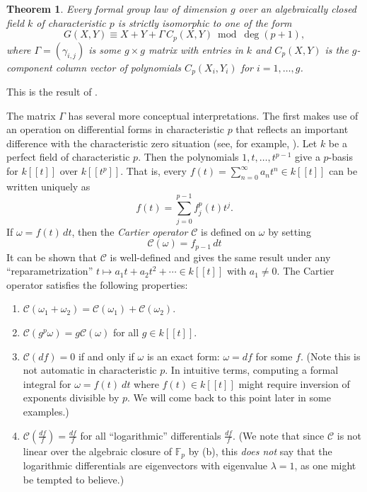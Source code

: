 \documentclass[12pt]{amsart}
\theoremstyle{theorem}
\newtheorem{thm}{Theorem}
\newcommand{\FF}{\mathbb{F}}
\begin{document}
\begin{thm}  Every formal group law of dimension $g$ over an algebraically closed field $k$ of characteristic $p$ is strictly isomorphic
\label{FGLawForm}
to one of the form 
\begin{equation}
\label{FGL}
G(X,Y) \equiv X + Y + \Gamma\, C_p(X,Y) \bmod \deg (p+1),
\end{equation}
where $\Gamma = (\gamma_{i,j})$ is some $g\times g$ matrix with entries in $k$ and $C_p(X,Y)$ is the $g$-component column vector of polynomials $C_p(X_i,Y_i)$
for $i = 1, \ldots, g$.
\end{thm}

This is the result of \cite[Prop. 20.1.7]{H}.  

\vskip 10pt

The matrix $\Gamma$ has several more conceptual interpretations.  The first makes use of an operation
on differential forms in characteristic $p$ that reflects an important difference with the characteristic zero situation (see, for example, \cite{Serre}).  
Let $k$ be 
a perfect field of characteristic $p$.  Then the polynomials $1, t, \ldots, t^{p-1}$ give a $p$-basis for 
$k[[t]]$ over $k[[t^p]]$.  That is, every $f(t) = \sum_{n=0}^\infty a_n t^n \in k[[t]]$ can be written uniquely as
$$f(t) = \sum_{j=0}^{p-1} f_j^p(t) t^j.$$
If $\omega = f(t)\, dt$, then the \emph{Cartier operator} $\mathcal{C}$ is defined on $\omega$ by setting
$$\mathcal{C}(\omega) = f_{p-1}\, dt$$
It can be shown that $\mathcal{C}$ is well-defined and gives the same result under any ``reparametrization''
$t \mapsto a_1 t + a_2 t^2 + \cdots \in k[[t]]$ with $a_1 \ne 0$.   The Cartier operator satisfies the following properties:
\vskip 5pt
\begin{enumerate}
\item[(a)] $\mathcal{C}(\omega_1 + \omega_2) = \mathcal{C}(\omega_1) + \mathcal{C}(\omega_2)$. \vskip 2pt
\item[(b)] $\mathcal{C}(g^p \omega) = g \mathcal{C}(\omega)$ for all $g \in k[[t]]$.\vskip 2pt
\item[(c)] $\mathcal{C}(df) = 0$ if and only if $\omega$ is an exact form: $\omega = df$ for some $f$.  (Note
this is not automatic in characteristic $p$.  In intuitive terms, computing a formal integral for $\omega = f(t)\ dt$ where
$f(t) \in k[[t]]$ might require inversion of exponents
divisible by $p$.  We will come back to this point later in some examples.) \vskip 2pt
\item[(d)] $\mathcal{C}\left(\frac{df}{f}\right) = \frac{df}{f}$ for all ``logarithmic'' differentials $\frac{df}{f}$.
(We note that since $\mathcal{C}$ is not linear over the algebraic closure of $\FF_p$ by (b), this \emph{does not}
say that the logarithmic differentials are eigenvectors with eigenvalue $\lambda = 1$, as one might be
tempted to believe.)
\end{enumerate}
\end{document}
